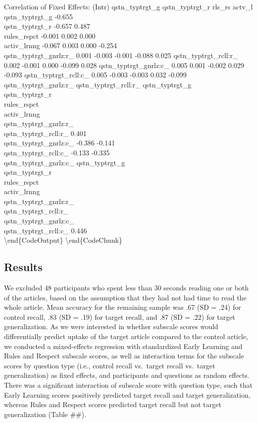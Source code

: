 \documentclass[10pt, letterpaper]{article}
\begin{document}
Correlation of Fixed Effects: (Intr) qstn\_typtrgt\_g qstn\_typtrgt\_r
rls\_rs actv\_l qstn\_typtrgt\_g -0.655\\qstn\_typtrgt\_r -0.657
0.487\\rules\_rspct -0.001 0.002 0.000\\activ\_lrnng -0.067 0.003 0.000
-0.254\\qstn\_typtrgt\_gnrlz:r\_ 0.001 -0.003 -0.001 -0.088 0.025
qstn\_typtrgt\_rcll:r\_ 0.002 -0.001 0.000 -0.099 0.028
qstn\_typtrgt\_gnrlz:c\_ 0.005 0.001 -0.002 0.029 -0.093
qstn\_typtrgt\_rcll:c\_ 0.005 -0.003 -0.003 0.032 -0.099
qstn\_typtrgt\_gnrlz:r\_ qstn\_typtrgt\_rcll:r\_
qstn\_typtrgt\_g\\qstn\_typtrgt\_r\\rules\_rspct\\activ\_lrnng\\qstn\_typtrgt\_gnrlz:r\_\\qstn\_typtrgt\_rcll:r\_
0.401\\qstn\_typtrgt\_gnrlz:c\_ -0.386 -0.141\\qstn\_typtrgt\_rcll:c\_
-0.133 -0.335\\ qstn\_typtrgt\_gnrlz:c\_
qstn\_typtrgt\_g\\qstn\_typtrgt\_r\\rules\_rspct\\activ\_lrnng\\qstn\_typtrgt\_gnrlz:r\_\\qstn\_typtrgt\_rcll:r\_\\qstn\_typtrgt\_gnrlz:c\_\\qstn\_typtrgt\_rcll:c\_
0.446\\\textbackslash{}end\{CodeOutput\}
\textbackslash{}end\{CodeChunk\}

\subsection{Results}\label{results}

We excluded 48 participants who spent less than 30 seconds reading one
or both of the articles, based on the assumption that they had not had
time to read the whole article. Mean accuracy for the remaining sample
was .67 (SD = .24) for control recall, .83 (SD = .19) for target recall,
and .87 (SD = .22) for target generalization. As we were interested in
whether subscale scores would differentially predict uptake of the
target article compared to the control article, we conducted a
mixed-effects regression with standardized Early Learning and Rules and
Respect subscale scores, as well as interaction terms for the subscale
scores by question type (i.e., control recall vs.~target recall
vs.~target generalization) as fixed effects, and participants and
questions as random effects. There was a significant interaction of
subscale score with question type, such that Early Learning scores
positively predicted target recall and target generalization, whereas
Rules and Respect scores predicted target recall but not target
generalization (Table \#\#).
\end{document}
